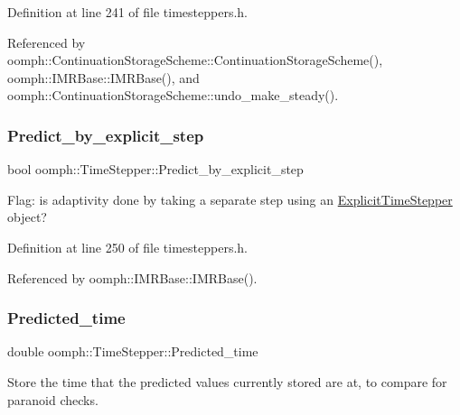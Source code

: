Definition at line 241 of file timesteppers.\+h.



Referenced by oomph\+::\+Continuation\+Storage\+Scheme\+::\+Continuation\+Storage\+Scheme(), oomph\+::\+I\+M\+R\+Base\+::\+I\+M\+R\+Base(), and oomph\+::\+Continuation\+Storage\+Scheme\+::undo\+\_\+make\+\_\+steady().

\mbox{\label{classoomph_1_1TimeStepper_a30f71fb3ee14db4dd9d9d2cef1189ddc}} 
\subsubsection{\texorpdfstring{Predict\+\_\+by\+\_\+explicit\+\_\+step}{Predict\_by\_explicit\_step}}
{\footnotesize\ttfamily bool oomph\+::\+Time\+Stepper\+::\+Predict\+\_\+by\+\_\+explicit\+\_\+step\hspace{0.3cm}{\ttfamily [protected]}}



Flag\+: is adaptivity done by taking a separate step using an \hyperlink{classoomph_1_1ExplicitTimeStepper}{Explicit\+Time\+Stepper} object? 



Definition at line 250 of file timesteppers.\+h.



Referenced by oomph\+::\+I\+M\+R\+Base\+::\+I\+M\+R\+Base().

\mbox{\label{classoomph_1_1TimeStepper_af41318cc5f48050e143182f59a06e5d6}} 
\subsubsection{\texorpdfstring{Predicted\+\_\+time}{Predicted\_time}}
{\footnotesize\ttfamily double oomph\+::\+Time\+Stepper\+::\+Predicted\+\_\+time\hspace{0.3cm}{\ttfamily [protected]}}

Store the time that the predicted values currently stored are at, to compare for paranoid checks. 


